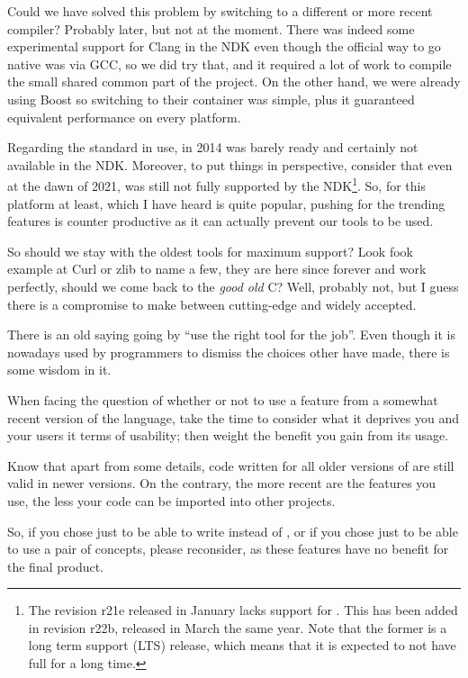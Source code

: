 \bigskip

Could we have solved this problem by switching to a different or more
recent compiler? Probably later, but not at the moment. There was
indeed some experimental support for Clang in the NDK even though the
official way to go native was via GCC, so we did try that, and it
required a lot of work to compile the small shared common part of the
project. On the other hand, we were already using Boost so switching
to their container was simple, plus it guaranteed equivalent
performance on every platform.

Regarding the standard in use, in 2014  was barely ready and
certainly not available in the NDK. Moreover, to put things in
perspective, consider that even at the dawn of 2021,  was still
not fully supported by the NDK\footnote{The revision r21e released in
  January lacks support for . This has been
  added in revision r22b, released in March the same year. Note that
  the former is a long term support (LTS) release, which means that it
  is expected to not have full  for a long time.}. So, for this
platform at least, which I have heard is quite popular, pushing for
the trending features is counter productive as it can actually prevent
our tools to be used.

So should we stay with the oldest tools for maximum support? Look fook
example at Curl or zlib to name a few, they are here since forever and
work perfectly, should we come back to the \emph{good old} C? Well,
probably not, but I guess there is a compromise to make between
cutting-edge and widely accepted.

\begin{guideline}
  There is an old saying going by ``use the right tool for the
  job''. Even though it is nowadays used by programmers to dismiss the choices
  other have made, there is some wisdom in it.

  When facing the question of whether or not to use a feature from a
  somewhat recent version of the language, take the time to consider
  what it deprives you and your users it terms of usability; then
  weight the benefit you gain from its usage.

  Know that apart from some details, code written for all older
  versions of \cpp{} are still valid in newer versions. On the
  contrary, the more recent are the features you use, the less your
  code can be imported into other projects.

  So, if you chose  just to be able to write  instead of , or if you chose 
  just to be able to use a pair of concepts, please reconsider, as
  these features have no benefit for the final product.
\end{guideline}
